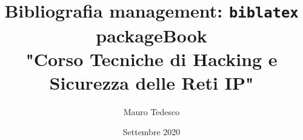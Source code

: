 \documentclass[a4paper,12pt]{book}
\title{Bibliografia management: \texttt{biblatex} package}
\begin{document}
	

\renewcommand{\chaptermark}[1]{ \markboth{#1}{} }
\renewcommand{\sectionmark}[1]{ \markright{#1}{} }

\renewcommand{\headrulewidth}{0.5pt}
\renewcommand{\footrulewidth}{1pt}




\author{Mauro Tedesco}
\title{Book \\
	"Corso Tecniche di Hacking e Sicurezza delle
	Reti IP"}
\date{Settembre 2020}

\frontmatter
\maketitle
\tableofcontents

\mainmatter



















\backmatter


\printindex

\printbibliography
\end{document}
